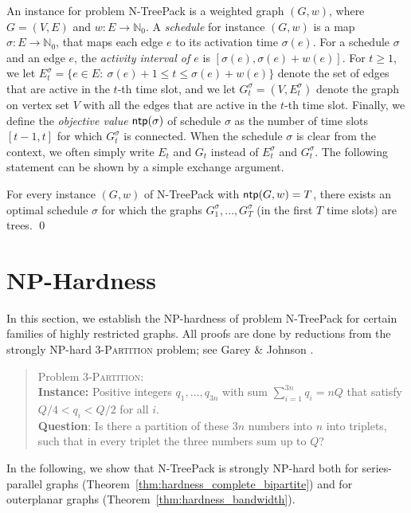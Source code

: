 \documentclass[runningheads]{llncs}
\newcommand{\NN}{\mathbb{N}}
\newcommand{\set}[1]{\{ #1 \}}
\newcommand{\xxxNTP}{{\sc N-TreePack}}
\DeclareMathOperator{\ntp}{\text{\sf ntp}}
\begin{document}
An instance for problem {\xxxNTP} is a weighted graph $(G,w)$, where $G=(V,E)$ and $w:E\to\NN_0$. 
A \emph{schedule} for instance $(G,w)$ is a map $\sigma:E\to\NN_0$, that maps each edge $e$ to 
its activation time $\sigma(e)$.
For a schedule $\sigma$ and an edge $e$, the \emph{activity interval of $e$} is $[\sigma(e),\sigma(e)+w(e)]$. 
For $t\ge1$, we let $E^\sigma_t= \set{e\in E:~ \sigma(e)+1 \le t \le \sigma(e)+w(e)}$ denote 
the set of edges that are active in the $t$-th time slot, and we let $G^\sigma_t=(V,E^\sigma_t)$ 
denote the graph on vertex set $V$ with all the edges that are active in the $t$-th time slot. 
Finally, we define the \emph{objective value} $\ntp(\sigma)$ of schedule $\sigma$ as the number of time 
slots $[t-1,t]$ for which $G^\sigma_t$ is connected. 
When the schedule $\sigma$ is clear from the context, we often simply write $E_t$ and $G_t$ instead of 
$E^\sigma_t$ and $G^\sigma_t$. 
The following statement can be shown by a simple exchange argument.
\begin{lemma}
\label{le:structure}
For every instance $(G,w)$ of {\xxxNTP} with $\ntp(G,w)=T$, there exists an optimal schedule $\sigma$ 
for which the graphs $G^\sigma_1,\ldots,G^\sigma_T$ (in the first $T$ time slots) are trees.
\qed
\end{lemma}


\section{NP-Hardness}
\label{sec:hardness}
In this section, we establish the NP-hardness of problem {\xxxNTP} for certain families of
highly restricted graphs. 
All proofs are done by reductions from the strongly NP-hard \textsc{3-Partition} problem;
see Garey \& Johnson \cite{garey1979computers}. 
\begin{quote}
Problem \textsc{3-Partition}: 
\\
\textbf{Instance:} Positive integers $q_1,\ldots,q_{3n}$ with sum $\sum_{i=1}^{3n}q_i=nQ$ that satisfy 
$Q/4<q_i<Q/2$ for all $i$.
\\
\textbf{Question}: Is there a partition of these $3n$ numbers into $n$ into triplets, such that in 
every triplet the three numbers sum up to $Q$?  
\end{quote}
In the following, we show that {\xxxNTP} is strongly NP-hard both for series-parallel 
graphs (Theorem~\ref{thm:hardness_complete_bipartite}) and for outerplanar graphs 
(Theorem~\ref{thm:hardness_bandwidth}). 
\end{document}
